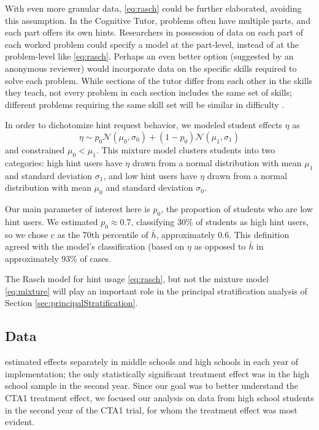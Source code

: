 \documentclass{article}\usepackage[]{graphicx}\usepackage[]{color}
\begin{document}
With even more granular data, \eqref{eq:rasch} could be further
elaborated, avoiding this assumption.
In the Cognitive Tutor, problems often have multiple parts, and each part offers its own hints.
Researchers in possession of data on each part of each worked problem could specify a model at the part-level, instead of at the problem-level like \eqref{eq:rasch}.
Perhaps an even better option (suggested by an anonymous reviewer) would incorporate data on the specific skills required to solve each problem.
While sections of the tutor differ from each other in the skills they teach, not every problem in each section includes the same set of skills; different problems requiring the same skill set will be similar in difficulty \citep[see, e.g.]{goldin2012learner,pavlik2009performance}.

In order to dichotomize hint request behavior, we modeled
student effects $\eta$ as
\begin{equation}\label{eq:mixture}
\eta\sim
p_0\mathcal{N}(\mu_0,\sigma_0)+(1-p_0)\mathcal{N}(\mu_1,\sigma_1)
\end{equation}
and constrained $\mu_0<\mu_1$.
This mixture model clusters students into two categories: high hint
users have $\eta$ drawn from a normal distribution with mean $\mu_1$
and standard deviation $\sigma_1$, and low hint users have $\eta$
drawn from a normal distribution with mean $\mu_0$ and standard
deviation $\sigma_0$.


Our main parameter of interest here is $p_0$, the proportion of
students who are low hint users.
We estimated $p_0\approx$0.7,
classifying 30\% of students as
high hint users, so we chose $c$ as the
70th percentile of $\bar{h}$,
approximately 0.6.
This definition agreed with the model's classification (based on
$\eta$ as opposed to $\bar{h}$ in
approximately 93\% of cases.

The Rasch model for hint usage \eqref{eq:rasch}, but not the mixture
model \eqref{eq:mixture} will play an important role in the principal
stratification analysis of Section \ref{sec:principalStratification}.



\subsection{Data}\label{sec:data}

\citep{pane2014effectiveness} estimated effects separately in middle
schools and high schools in each year of implementation; the
only statistically significant treatment effect was in the high school
sample in the second year.
Since our goal was to better understand the CTA1
treatment effect, we focused our analysis on data from high school students in
the second year of the CTA1 trial, for whom the treatment effect was
most evident.
\end{document}
